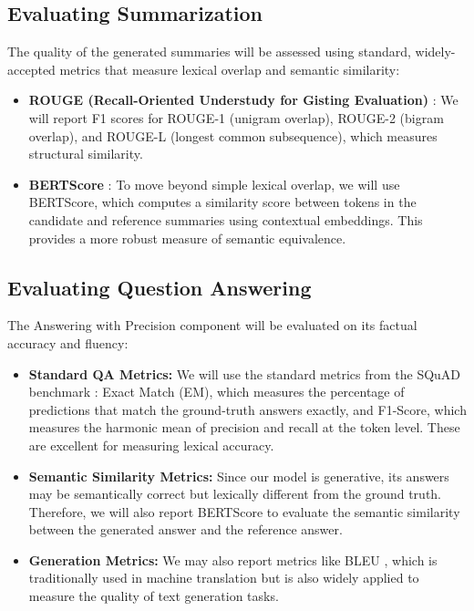 \documentclass[11pt]{article}
\begin{document}
\subsection{Evaluating Summarization}
The quality of the generated summaries will be assessed using standard, widely-accepted metrics that measure lexical overlap and semantic similarity:
\begin{itemize}
    \item \textbf{ROUGE (Recall-Oriented Understudy for Gisting Evaluation)} \citep{lin-2004-rouge}: We will report F1 scores for ROUGE-1 (unigram overlap), ROUGE-2 (bigram overlap), and ROUGE-L (longest common subsequence), which measures structural similarity.
    \item \textbf{BERTScore} \citep{zhang2020bertscoreevaluatingtextgeneration}: To move beyond simple lexical overlap, we will use BERTScore, which computes a similarity score between tokens in the candidate and reference summaries using contextual embeddings. This provides a more robust measure of semantic equivalence.
\end{itemize}

\subsection{Evaluating Question Answering}
The Answering with Precision component will be evaluated on its factual accuracy and fluency:
\begin{itemize}
    \item \textbf{Standard QA Metrics:} We will use the standard metrics from the SQuAD benchmark \citep{rajpurkar2016squad100000questionsmachine}: Exact Match (EM), which measures the percentage of predictions that match the ground-truth answers exactly, and F1-Score, which measures the harmonic mean of precision and recall at the token level. These are excellent for measuring lexical accuracy.
    \item \textbf{Semantic Similarity Metrics:} Since our model is generative, its answers may be semantically correct but lexically different from the ground truth. Therefore, we will also report BERTScore to evaluate the semantic similarity between the generated answer and the reference answer.
    \item \textbf{Generation Metrics:} We may also report metrics like BLEU \citep{papineni-etal-2002-bleu}, which is traditionally used in machine translation but is also widely applied to measure the quality of text generation tasks.
\end{itemize}


\end{document}
